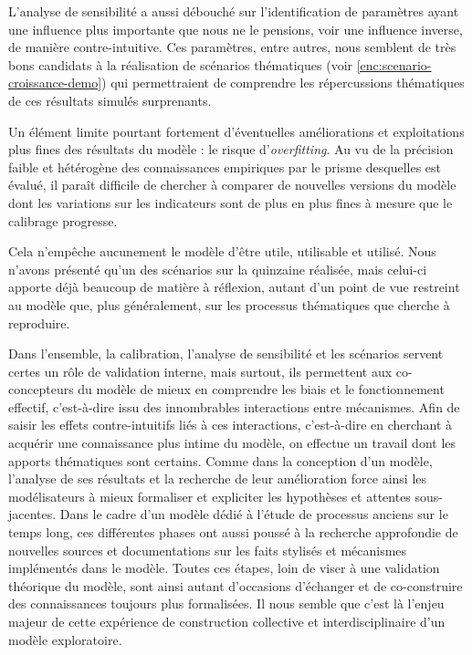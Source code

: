 L'analyse de sensibilité a aussi débouché sur l'identification de paramètres ayant une influence plus importante que nous ne le pensions, voir une influence inverse, de manière contre-intuitive.
Ces paramètres, entre autres, nous semblent de très bons candidats à la réalisation de scénarios thématiques (voir \cref{enc:scenario-croissance-demo}) qui permettraient de comprendre les répercussions thématiques de ces résultats simulés surprenants.

Un élément limite pourtant fortement d'éventuelles améliorations et exploitations plus fines des résultats du modèle : le risque d'\textit{overfitting}.
Au vu de la précision faible et hétérogène des connaissances empiriques par le prisme desquelles \simfeodal{} est évalué, il paraît difficile de chercher à comparer de nouvelles versions du modèle dont les variations sur les indicateurs sont de plus en plus fines à mesure que le calibrage progresse.

Cela n'empêche aucunement le modèle d'être utile, utilisable et utilisé.
Nous n'avons présenté qu'un des scénarios sur la quinzaine réalisée, mais celui-ci apporte déjà beaucoup de matière à réflexion, autant d'un point de vue restreint au modèle que, plus généralement, sur les processus thématiques que \simfeodal{} cherche à reproduire.

Dans l'ensemble, la calibration, l'analyse de sensibilité et les scénarios servent certes un rôle de validation interne, mais surtout, ils permettent aux co-concepteurs du modèle de mieux en comprendre les biais et le fonctionnement effectif, c'est-à-dire issu des innombrables interactions entre mécanismes.
Afin de saisir les effets contre-intuitifs liés à ces interactions, c'est-à-dire en cherchant à acquérir une connaissance plus intime du modèle, on effectue un travail dont les apports thématiques sont certains.
Comme dans la conception d'un modèle, l'analyse de ses résultats et la recherche de leur amélioration force ainsi les modélisateurs à mieux formaliser et expliciter les hypothèses et attentes sous-jacentes.
Dans le cadre d'un modèle dédié à l'étude de processus anciens sur le temps long, ces différentes phases ont aussi poussé à la recherche approfondie de nouvelles sources et documentations sur les faits stylisés et mécanismes implémentés dans le modèle.
Toutes ces étapes, loin de viser à une validation théorique du modèle, sont ainsi autant d'occasions d'échanger et de co-construire des connaissances toujours plus formalisées.
Il nous semble que c'est là l'enjeu majeur de cette expérience de construction collective et interdisciplinaire d'un modèle exploratoire.
